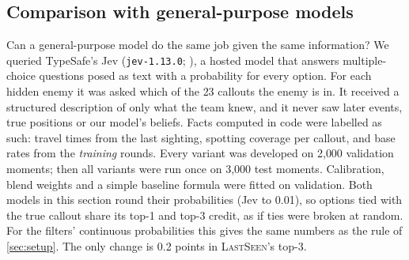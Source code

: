 \documentclass[11pt]{article}
\newcommand{\model}[1]{\textsc{#1}}
\newcommand{\1}{\mathbb{1}}
\begin{document}
\subsection{Comparison with general-purpose models}
\label{sec:jev}
Can a general-purpose model do the same job given the same information? We queried TypeSafe's Jev (\texttt{jev-1.13.0}; \citealp{typesafe2026}), a hosted model that answers multiple-choice questions posed as text with a probability for every option. For each hidden enemy it was asked which of the 23 callouts the enemy is in. It received a structured description of only what the team knew, and it never saw later events, true positions or our model's beliefs. Facts computed in code were labelled as such: travel times from the last sighting, spotting coverage per callout, and base rates from the \emph{training} rounds. Every variant was developed on 2{,}000 validation moments; then all variants were run once on 3{,}000 test moments. Calibration, blend weights and a simple baseline formula were fitted on validation. Both models in this section round their probabilities (Jev to 0.01), so options tied with the true callout share its top-1 and top-3 credit, as if ties were broken at random. For the filters' continuous probabilities this gives the same numbers as the rule of \cref{sec:setup}. The only change is 0.2 points in \model{LastSeen}'s top-3.
\end{document}
